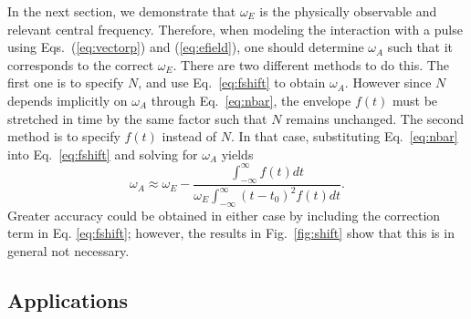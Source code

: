 In the next section, we demonstrate that $\omega_E$ is the physically observable and relevant central frequency. Therefore, when modeling the interaction with a pulse using Eqs.~(\ref{eq:vectorp}) and (\ref{eq:efield}), one should determine $\omega_A$  such that it corresponds to the correct $\omega_E$. There are two different methods to do this. The first one is to specify $N$, and use Eq.~\ref{eq:fshift} to obtain $\omega_A$. However since $N$ depends implicitly on $\omega_A$ through Eq.~\ref{eq:nbar}, the envelope $f(t)$ must be stretched in time by the same factor such that $N$ remains unchanged. The second method is to specify $f(t)$ instead of $N$. In that case, substituting Eq.~\ref{eq:nbar} into Eq.~\ref{eq:fshift} and solving for $\omega_A$ yields
%
\begin{equation}
\label{eq:alternative}
\omega_A \approx \omega_E - \frac{\int_{-\infty}^{\infty} f(t) dt}{\omega_E\int_{-\infty}^{\infty} (t-t_0)^2 f(t) dt}.
\end{equation}
%
Greater accuracy could be obtained in either case by including the correction term in Eq. \ref{eq:fshift}; however, the results in Fig.~\ref{fig:shift} show that this is in general not necessary. 

\subsection{Applications}
\label{sec:applications}

